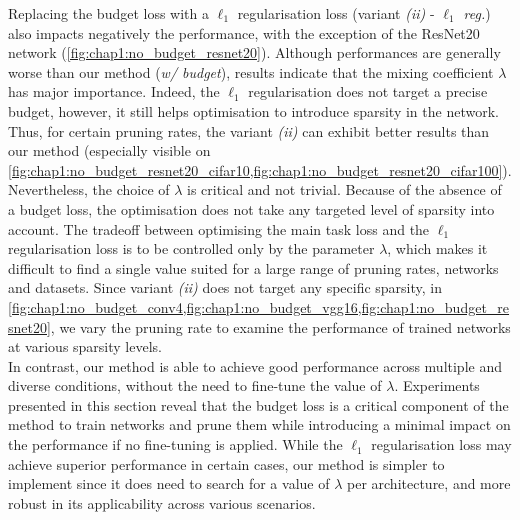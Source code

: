 Replacing the budget loss with a $\ell_1$ regularisation loss (variant
\emph{(ii)} - \emph{$\ell_1$ reg.}) also impacts negatively the performance,
with the exception of the ResNet20 network
(\cref{fig:chap1:no_budget_resnet20}). Although performances are generally worse
than our method (\emph{w/ budget}), results indicate that the mixing coefficient
$\lambda$ has major importance. Indeed, the $\ell_1$ regularisation does not
target a precise budget, however, it still helps optimisation to introduce
sparsity in the network. Thus, for certain pruning rates, the variant
\emph{(ii)} can exhibit better results than our method (especially visible on
\cref{fig:chap1:no_budget_resnet20_cifar10,fig:chap1:no_budget_resnet20_cifar100}).
Nevertheless, the choice of $\lambda$ is critical and not trivial. Because of
the absence of a budget loss, the optimisation does not take any targeted level
of sparsity into account. The tradeoff between optimising the main task loss and
the $\ell_1$ regularisation loss is to be controlled only by the parameter
$\lambda$, which makes it difficult to find a single value suited for a large
range of pruning rates, networks and datasets. Since variant \emph{(ii)} does
not target any specific sparsity, in
\cref{fig:chap1:no_budget_conv4,fig:chap1:no_budget_vgg16,fig:chap1:no_budget_resnet20},
we vary the pruning rate to examine the performance of trained networks at
various sparsity levels.\\

In contrast, our method is able to achieve good performance across multiple and
diverse conditions, without the need to fine-tune the value of $\lambda$.
Experiments presented in this section reveal that the budget loss is a critical
component of the method to train networks and prune them while introducing a
minimal impact on the performance if no fine-tuning is applied. While the
$\ell_1$ regularisation loss may achieve superior performance in certain cases,
our method is simpler to implement since it does need to search for a value of
$\lambda$ per architecture, and more robust in its applicability across various
scenarios.\\

